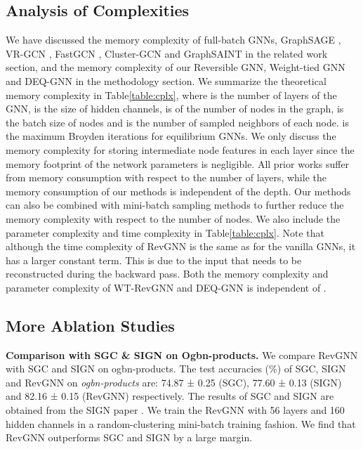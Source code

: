 \documentclass{article}
\newcommand{\tblLabel}{Table\xspace}
\newcommand{\mysection}[1]{\vspace{0pt}\noindent\textbf{#1.}}
\begin{document}
\subsection{Analysis of Complexities}
We have discussed the memory complexity of full-batch GNNs, GraphSAGE \citep{hamilton2017inductive}, VR-GCN \citep{chen2018stochastic}, FastGCN \citep{chen2018fastgcn}, Cluster-GCN \citep{chiang2019cluster} and GraphSAINT \citep{graphsaint-iclr20} in the related work section, and the memory complexity of our Reversible GNN, Weight-tied GNN and DEQ-GNN in the methodology section. We summarize the theoretical memory complexity in \tblLabel \ref{table:cplx}, where  is the number of layers of the GNN,  is the size of hidden channels,  is of the number of nodes in the graph,  is the batch size of nodes and  is the number of sampled neighbors of each node.  is the maximum Broyden iterations for equilibrium GNNs. We only discuss the memory complexity for storing intermediate node features in each layer since the memory footprint of the network parameters is negligible. All prior works suffer from memory consumption with respect to the number of layers, while the memory consumption of our methods is independent of the depth. Our methods can also be combined with mini-batch sampling methods to further reduce the memory complexity with respect to the number of nodes. We also include the parameter complexity and time complexity in \tblLabel \ref{table:cplx}. Note that although the time complexity of RevGNN is the same as for the vanilla GNNs, it has a larger constant term. This is due to the input that needs to be reconstructed during the backward pass. Both the memory complexity and parameter complexity of WT-RevGNN and DEQ-GNN is independent of .

\subsection{More Ablation Studies}

\mysection{Comparison with SGC \& SIGN on Ogbn-products} 
We compare RevGNN with SGC \citep{wu2019simplifying} and SIGN \citep{sign_icml_grl2020} on ogbn-products. The test accuracies (\%) of SGC, SIGN and RevGNN on \emph{ogbn-products} are: 74.87 ± 0.25 (SGC), 77.60 ± 0.13 (SIGN) and 82.16 ± 0.15 (RevGNN) respectively.
The results of SGC and SIGN are obtained from the SIGN paper \citep{sign_icml_grl2020}. We train the RevGNN with 56 layers and 160 hidden channels in a random-clustering mini-batch training fashion. We find that RevGNN outperforms SGC and SIGN by a large margin.
\end{document}

